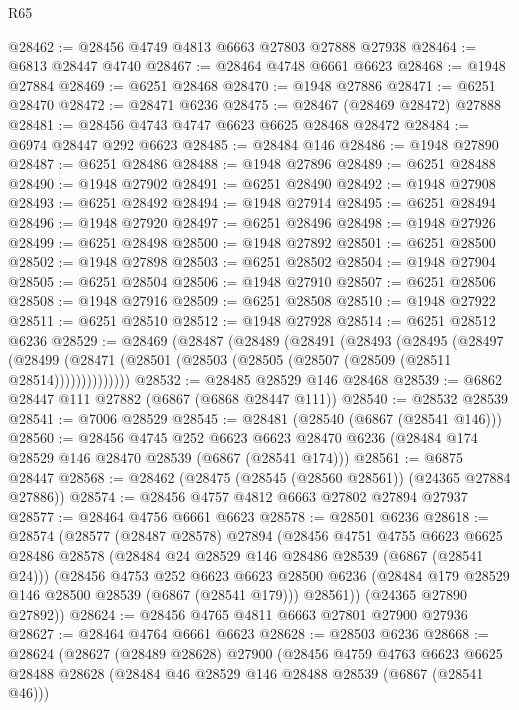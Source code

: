 \begin{lexlean}{R65}
\begin{coremodule}
{@28462 := @28456 @4749 @4813 @6663 @27803 @27888 @27938
@28464 := @6813 @28447 @4740
@28467 := @28464 @4748 @6661 @6623
@28468 := @1948 @27884
@28469 := @6251 @28468
@28470 := @1948 @27886
@28471 := @6251 @28470
@28472 := @28471 @6236
@28475 := @28467 (@28469 @28472) @27888
@28481 := @28456 @4743 @4747 @6623 @6625 @28468 @28472
@28484 := @6974 @28447 @292 @6623
@28485 := @28484 @146
@28486 := @1948 @27890
@28487 := @6251 @28486
@28488 := @1948 @27896
@28489 := @6251 @28488
@28490 := @1948 @27902
@28491 := @6251 @28490
@28492 := @1948 @27908
@28493 := @6251 @28492
@28494 := @1948 @27914
@28495 := @6251 @28494
@28496 := @1948 @27920
@28497 := @6251 @28496
@28498 := @1948 @27926
@28499 := @6251 @28498
@28500 := @1948 @27892
@28501 := @6251 @28500
@28502 := @1948 @27898
@28503 := @6251 @28502
@28504 := @1948 @27904
@28505 := @6251 @28504
@28506 := @1948 @27910
@28507 := @6251 @28506
@28508 := @1948 @27916
@28509 := @6251 @28508
@28510 := @1948 @27922
@28511 := @6251 @28510
@28512 := @1948 @27928
@28514 := @6251 @28512 @6236
@28529 := @28469
    (@28487
      (@28489
        (@28491
          (@28493
            (@28495
              (@28497
                (@28499 (@28471 (@28501 (@28503 (@28505 (@28507 (@28509 (@28511 @28514))))))))))))))
@28532 := @28485 @28529 @146 @28468
@28539 := @6862 @28447 @111 @27882 (@6867 (@6868 @28447 @111))
@28540 := @28532 @28539
@28541 := @7006 @28529
@28545 := @28481 (@28540 (@6867 (@28541 @146)))
@28560 := @28456
    @4745
    @252
    @6623
    @6623
    @28470
    @6236
    (@28484 @174 @28529 @146 @28470 @28539 (@6867 (@28541 @174)))
@28561 := @6875 @28447
@28568 := @28462 (@28475 (@28545 (@28560 @28561)) (@24365 @27884 @27886))
@28574 := @28456 @4757 @4812 @6663 @27802 @27894 @27937
@28577 := @28464 @4756 @6661 @6623
@28578 := @28501 @6236
@28618 := @28574
    (@28577
      (@28487 @28578)
      @27894
      (@28456
        @4751
        @4755
        @6623
        @6625
        @28486
        @28578
        (@28484 @24 @28529 @146 @28486 @28539 (@6867 (@28541 @24)))
        (@28456
          @4753
          @252
          @6623
          @6623
          @28500
          @6236
          (@28484 @179 @28529 @146 @28500 @28539 (@6867 (@28541 @179)))
          @28561))
      (@24365 @27890 @27892))
@28624 := @28456 @4765 @4811 @6663 @27801 @27900 @27936
@28627 := @28464 @4764 @6661 @6623
@28628 := @28503 @6236
@28668 := @28624
    (@28627
      (@28489 @28628)
      @27900
      (@28456
        @4759
        @4763
        @6623
        @6625
        @28488
        @28628
        (@28484 @46 @28529 @146 @28488 @28539 (@6867 (@28541 @46)))
}
\end{coremodule}
\end{lexlean}
